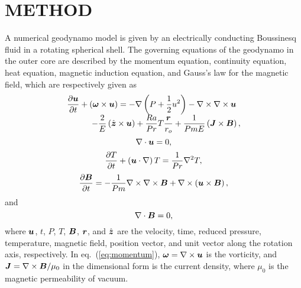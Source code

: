 \section{METHOD}

A numerical geodynamo model is given by an electrically conducting Boussinesq fluid in a rotating spherical shell. The governing equations of the geodynamo in the outer core are described by the momentum equation, continuity equation, heat equation, magnetic induction equation, and Gauss's law for the magnetic field, which are respectively given as
%
\begin{equation}
\begin{array}{l}
\displaystyle
\frac{\partial \mbox{\boldmath$u$}}{\partial t} + \left(\mbox{\boldmath$\omega$} \times \mbox{\boldmath$u$}\right)
 = - \nabla \left(P+\frac{1}{2}u^{2} \right) - \nabla \times \nabla \times \mbox{\boldmath$u$}
\\
\displaystyle
\hspace*{3em}
      - \frac{2}{E} \left(\hat{\mbox{\boldmath$z$}} \times \mbox{\boldmath$u$} \right)
  + \frac{Ra}{Pr} T \frac{\mbox{\boldmath$r$}}{r_{o}}
        + \frac{1}{Pm E} \left(\mbox{\boldmath$J$} \times \mbox{\boldmath$B$} \right),
\label{eq:momentum}
\end{array}
\end{equation}
%
\begin{equation}
\nabla \cdot \mbox{\boldmath$u$} = 0, 
\label{eq:conservation}
\end{equation}
%
\begin{equation}
\frac{\partial T}{\partial t} + \left(\mbox{\boldmath$u$} \cdot \nabla \right) T
 = \frac{1}{Pr} \nabla^{2} T,
\label{eq:heat}
\end{equation}
%
\begin{equation}
 \frac{\partial \mbox{\boldmath$B$}}{\partial t}
 = -\frac{1}{Pm}  \nabla \times \nabla \times \mbox{\boldmath$B$}
       + \nabla \times \left(\mbox{\boldmath$u$} \times \mbox{\boldmath$B$} \right),
\label{eq:induction}
\end{equation}
%
and
\begin{equation}
\nabla \cdot \mbox{\boldmath$B$} = 0,
\label{eq:Gauss_B}
\end{equation}
%
where $\mbox{\boldmath$u$}$, $t$, $P$, $T$, $\mbox{\boldmath$B$}$, $\mbox{\boldmath$r$}$, and $\hat{\mbox{\boldmath$z$}}$ are the velocity, time, reduced pressure, temperature, magnetic field, position vector, and unit vector along the rotation axis, respectively.
In eq.~(\ref{eq:momentum}), $\mbox{\boldmath$\omega$} = \nabla \times \mbox{\boldmath$u$}$ is the vorticity, and $\mbox{\boldmath$J$} = \nabla \times \mbox{\boldmath$B$} / \mu_0$ in the dimensional form is the current density, where $\mu_0$ is the magnetic permeability of vacuum.
